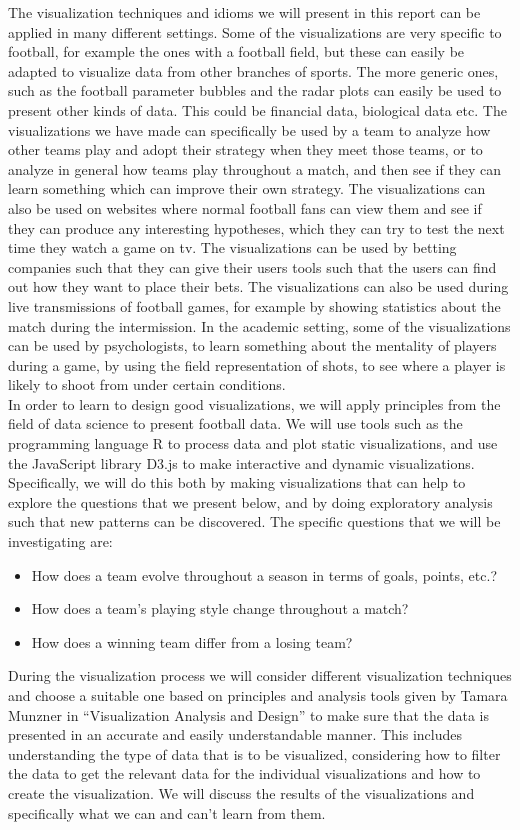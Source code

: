 \documentclass[Report.tex]{subfiles}
\begin{document}
The visualization techniques and idioms we will present in this report can be applied in many different settings. Some of the visualizations are very specific to football, for example the ones with a football field, but these can easily be adapted to visualize data from other branches of sports. The more generic ones, such as the football parameter bubbles and the radar plots can easily be used to present other kinds of data. This could be financial data, biological data etc. The visualizations we have made can specifically be used by a team to analyze how other teams play and adopt their strategy when they meet those teams, or to analyze in general how teams play throughout a match, and then see if they can learn something which can improve their own strategy. The visualizations can also be used on websites where normal football fans can view them and see if they can produce any interesting hypotheses, which they can try to test the next time they watch a game on tv. The visualizations can be used by betting companies such that they can give their users tools such that the users can find out how they want to place their bets. The visualizations can also be used during live transmissions of football games, for example by showing statistics about the match during the intermission. In the academic setting, some of the visualizations can be used by psychologists, to learn something about the mentality of players during a game, by using the field representation of shots, to see where a player is likely to shoot from under certain conditions.
\\

In order to learn to design good visualizations, we will apply principles from the field of data science to present football data. We will use tools such as the programming language R to process data and plot static visualizations, and use the JavaScript library D3.js to make interactive and dynamic visualizations. 
Specifically, we will do this both by making visualizations that can help to explore the questions that we present below, and by doing exploratory analysis such that new patterns can be discovered. The specific questions that we will be investigating are: 
\begin{itemize}
\item How does a team evolve throughout a season in terms of goals, points,
etc.?
\item How does a team’s playing style change throughout a match?
\item How does a winning team differ from a losing team?
\end{itemize}
During the visualization process we will consider different visualization techniques and choose a suitable one based on principles and analysis tools given by Tamara Munzner in “Visualization Analysis and Design” to make sure that the data is presented in an accurate and easily understandable manner. This includes understanding the type of data that is to be visualized, considering how to filter the data to get the relevant data for the individual visualizations and how to create the visualization. We will discuss the results of the visualizations and specifically what we can and can’t learn from them.
\end{document}
